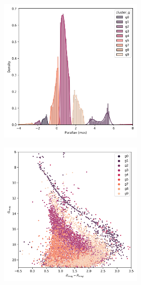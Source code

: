 \documentclass[11pt,a4paper,english,twocolumn]{article}
\begin{document}
\begin{figure}[htbp]
\begin{subfigure}{\columnwidth}
\begin{subfigure}[t]{0.30\textwidth}
    \end{subfigure}
    \hfill
    \begin{subfigure}[t]{0.30\textwidth}
      \centering
      \includegraphics[width=\textwidth]{../figures/ngc_2632/dec_parallax_filtered_ngc_2632.png}
    \end{subfigure}
    \hfill
    \begin{subfigure}[t]{0.30\textwidth}
      \centering
      \includegraphics[width=\textwidth]{../figures/ngc_2632/dec_hr_diagram_filtered_ngc_2632.png}

\end{subfigure}
\end{subfigure}
\end{figure}
\end{document}

